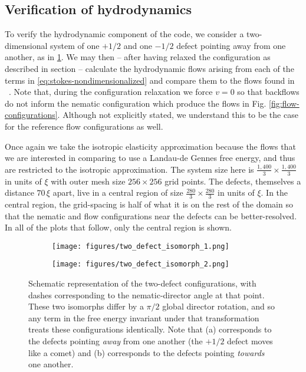 \documentclass[reqno]{article}
\begin{document}
  \subsection{Verification of hydrodynamics}
  To verify the hydrodynamic component of the code, we consider a
  two-dimensional system of one
  $+1/2$ and one $-1/2$ defect pointing away from one another, as in
  \ref{fig:two-defect-isomorph-1}.
  We may then -- after having relaxed the configuration as described in
  section \label{algorithm details} --
  calculate the hydrodynamic flows arising from each of the terms in
  \eqref{eq:stokes-nondimensionalized} and compare them to the flows found in
  ~\cite{svensek_complex_2002}.
  Note that, during the configuration relaxation we force $v = 0$ so that
  backflows do not inform the nematic configuration which produce the flows in
  Fig. \ref{fig:flow-configurations}.
  Although not explicitly stated, we understand this to be the case for the
  reference flow configurations as well.
  
  Once again we take the isotropic elasticity approximation because the flows
  that we are interested in comparing to use a Landau-de Gennes free energy, and
  thus are restricted to the isotropic approximation.
  The system size here is $\frac{1,400}{3} \times \frac{1,400}{3}$ in units of
  $\xi$ with outer mesh size $256\times 256$ grid points.
  The defects, themselves a distance $70 \, \xi$ apart, live in a central region of
  size $\frac{280}{3} \times \frac{280}{3}$ in units of $\xi$.
  In the central region, the grid-spacing is half of what it is on the rest of
  the domain so that the nematic and flow configurations near the defects can be
  better-resolved.
  In all of the plots that follow, only the central region is shown.
  
  \begin{figure}[h]
    \centering
    \begin{subfigure}{0.45\textwidth}
      \texttt{[image: figures/two\_defect\_isomorph\_1.png]}
      \caption{}
      \label{fig:two-defect-isomorph-1}
    \end{subfigure}
    \hfill
    \begin{subfigure}{0.45\textwidth}
      \texttt{[image: figures/two\_defect\_isomorph\_2.png]}
      \caption{}
      \label{fig:two-defect-isomorph-2}
    \end{subfigure}
    \caption{Schematic representation of the two-defect configurations, with
      dashes corresponding to the nematic-director angle at that point. These
      two isomorphs differ by a $\pi/2$ global director rotation, and so any
      term in the free energy invariant under that transformation treats these
      configurations identically. Note that (a) corresponds to the defects
      pointing \textit{away} from one another (the $+1/2$ defect moves like a
      comet) and (b) corresponds to the defects pointing \textit{towards} one another.}
  \end{figure}
  
\end{document}
